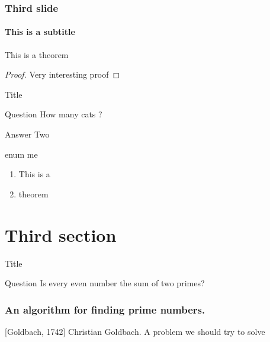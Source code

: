 \documentclass[xcolor=pdftex,dvipsnames,table]{beamer}
\begin{document}
\begin{frame}[t] %
  \frametitle{Third slide}
  \framesubtitle{This is a subtitle}
  \begin{theorem}
    This is a theorem
  \end{theorem}
  \begin{proof}
    Very interesting proof
  \end{proof}
\end{frame}

\begin{frame}{Title}
  \begin{block}{Question}
    How many cats ?
  \end{block}
  \begin{block}{Answer}
    Two
  \end{block}
  \begin{block}{enum me}
    \begin{enumerate}
        \item<1-> This is a
        \item<2-> theorem
    \end{enumerate}
  \end{block}
\end{frame}

\section{Third section}

\begin{frame}{Title}
  \begin{block}{Question}
    Is every even number the sum of two primes?
    \cite{Goldbach1742}
  \end{block}
\end{frame}

\begin{frame}[fragile]
  \frametitle{An algorithm for finding prime numbers.}
  \mycode
\end{frame}


\begin{thebibliography}{5}
  [Goldbach, 1742]
  Christian Goldbach.
  \newblock A problem we should try to solve
\end{thebibliography}

\end{document}
